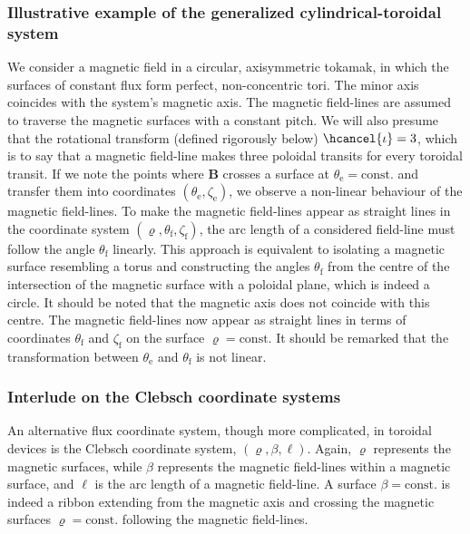 \subsubsection{Illustrative example of the generalized cylindrical-toroidal system}

We consider a magnetic field in a circular, axisymmetric tokamak, in which the surfaces of constant flux form perfect, non-concentric tori. The minor axis coincides with the system's magnetic axis. The magnetic field-lines are assumed to traverse the magnetic surfaces with a constant pitch. We will also presume that the rotational transform (defined rigorously below) $\hcancel{\iota}=3$, which is to say that a magnetic field-line makes three poloidal transits for every toroidal transit. If we note the points where $\mathbf{B}$ crosses a surface at $\theta_\text{e}=\text{const.}$ and transfer them into coordinates $(\theta_\text{e}, \zeta_\text{e})$, we observe a non-linear behaviour of the magnetic field-lines. To make the magnetic field-lines appear as straight lines in the coordinate system $(\varrho, \theta_\text{f}, \zeta_\text{f})$, the arc length of a considered field-line must follow the angle $\theta_\text{f}$ linearly. This approach is equivalent to isolating a magnetic surface resembling a torus and constructing the angles $\theta_\text{f}$ from the centre of the intersection of the magnetic surface with a poloidal plane, which is indeed a circle. It should be noted that the magnetic axis does not coincide with this centre. The magnetic field-lines now appear as straight lines in terms of coordinates $\theta_\text{f}$ and $\zeta_\text{f}$ on the surface $\varrho=\text{const.}$ It should be remarked that the transformation between $\theta_\text{e}$ and $\theta_\text{f}$ is not linear.

\subsubsection{Interlude on the Clebsch coordinate systems}

\label{clebschinterlude}

An alternative flux coordinate system, though more complicated, in toroidal devices is the Clebsch coordinate system, $(\varrho, \beta, \ell)$. Again, $\varrho$ represents the magnetic surfaces, while $\beta$ represents the magnetic field-lines within a magnetic surface, and $\ell$ is the arc length of a magnetic field-line. A surface $\beta=\text{const.}$ is indeed a ribbon extending from the magnetic axis and crossing the magnetic surfaces $\varrho=\text{const.}$ following the magnetic field-lines.

